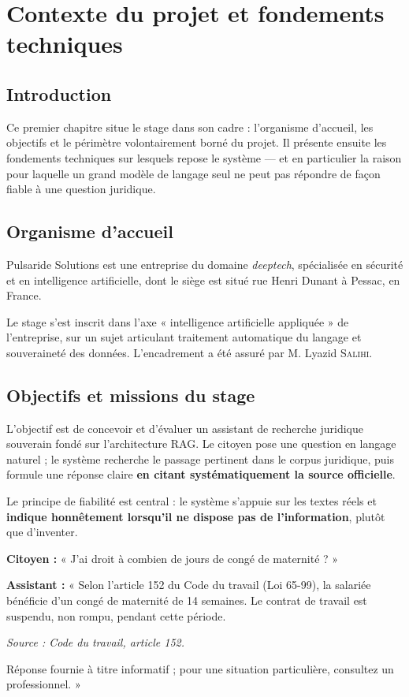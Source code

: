 \chapter{Contexte du projet et fondements techniques}
\label{chap:contexte}

\section*{Introduction}

Ce premier chapitre situe le stage dans son cadre : l'organisme d'accueil, les objectifs et le
périmètre volontairement borné du projet. Il présente ensuite les fondements techniques sur
lesquels repose le système --- et en particulier la raison pour laquelle un grand modèle de
langage seul ne peut pas répondre de façon fiable à une question juridique.

\section{Organisme d'accueil}

Pulsaride Solutions est une entreprise du domaine \textit{deeptech}, spécialisée en sécurité et
en intelligence artificielle, dont le siège est situé rue Henri Dunant à Pessac, en France.

Le stage s'est inscrit dans l'axe « intelligence artificielle appliquée » de l'entreprise, sur un
sujet articulant traitement automatique du langage et souveraineté des données. L'encadrement a
été assuré par M. Lyazid \textsc{Salihi}.

\section{Objectifs et missions du stage}

L'objectif est de concevoir et d'évaluer un assistant de recherche juridique souverain fondé sur
l'architecture RAG. Le citoyen pose une question en langage naturel ; le système recherche le
passage pertinent dans le corpus juridique, puis formule une réponse claire \textbf{en citant
systématiquement la source officielle}.

Le principe de fiabilité est central : le système s'appuie sur les textes réels et
\textbf{indique honnêtement lorsqu'il ne dispose pas de l'information}, plutôt que d'inventer.

\begin{tcolorbox}[colback=gray!5,colframe=gray!40,title=Exemple d'interaction visée]
\textbf{Citoyen :} « J'ai droit à combien de jours de congé de maternité ? »

\medskip
\textbf{Assistant :} « Selon l'article 152 du Code du travail (Loi 65-99), la salariée bénéficie
d'un congé de maternité de 14 semaines. Le contrat de travail est suspendu, non rompu, pendant
cette période.

\textit{Source : Code du travail, article 152.}

Réponse fournie à titre informatif ; pour une situation particulière, consultez un
professionnel. »
\end{tcolorbox}

